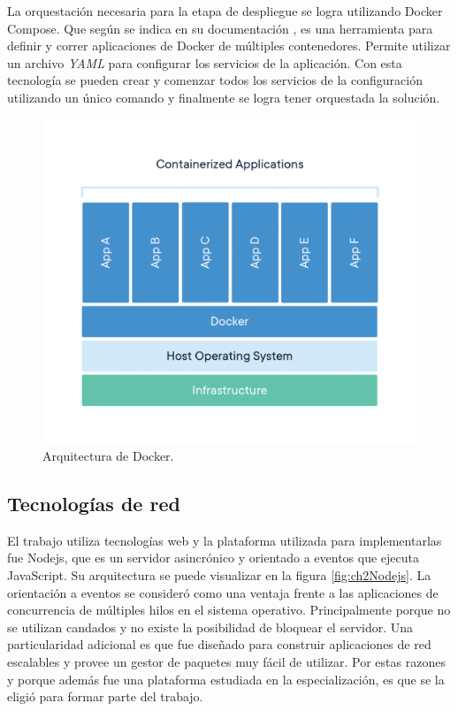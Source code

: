 La orquestación necesaria para la etapa de despliegue se logra utilizando Docker Compose.
Que según se indica en su documentación \citep{WEBSITE:WhatDockerCompose}, es una herramienta para definir y correr aplicaciones de Docker de múltiples contenedores.
Permite utilizar un archivo \emph{YAML} para configurar los servicios de la aplicación.
Con esta tecnología se pueden crear y comenzar todos los servicios de la configuración utilizando un único comando y finalmente se logra tener orquestada la solución.

\begin{figure}[h]
	\centering
	\includegraphics[width=\textwidth]{./Figures/ch2DockerContainer.png}
	\caption{Arquitectura de Docker. \citep{WEBSITE:WhatContainer}}
	\label{fig:ch2WhatContainer}
\end{figure}

\subsection{Tecnologías de red}
El trabajo utiliza tecnologías web y la plataforma utilizada para implementarlas fue Nodejs, que es un servidor asincrónico y orientado a eventos que ejecuta JavaScript.
Su arquitectura se puede visualizar en la figura \ref{fig:ch2Nodejs}.
La orientación a eventos se consideró como una ventaja frente a las aplicaciones de concurrencia de múltiples hilos en el sistema operativo.
Principalmente porque no se utilizan candados y no existe la posibilidad de bloquear el servidor.
Una particularidad adicional es que fue diseñado para construir aplicaciones de red escalables y provee un gestor de paquetes muy fácil de utilizar.
Por estas razones y porque además fue una plataforma estudiada en la especialización, es que se la eligió para formar parte del trabajo.

